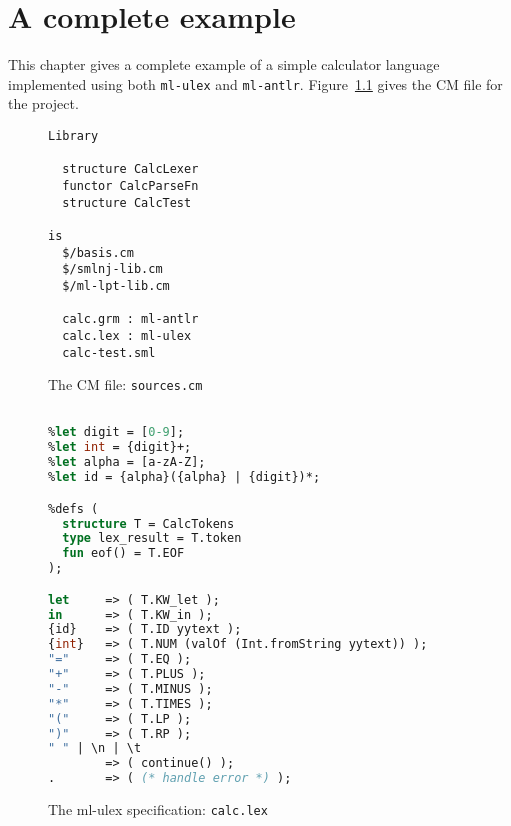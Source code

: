 %
\chapter{A complete example}
\label{ch:example}

This chapter gives a complete example of a simple calculator
language implemented using both \texttt{ml-ulex} and \texttt{ml-antlr}.
Figure~\ref{fig:calc-sources} gives the CM file for the project.
\begin{figure}[h]
\begin{lstlisting}[language=CM]
Library

  structure CalcLexer
  functor CalcParseFn
  structure CalcTest

is
  $/basis.cm
  $/smlnj-lib.cm
  $/ml-lpt-lib.cm

  calc.grm : ml-antlr
  calc.lex : ml-ulex
  calc-test.sml
\end{lstlisting}%
\caption{The CM file: {\tt sources.cm}}
\label{fig:calc-sources}
\end{figure}%

\begin{figure}

\begin{lstlisting}[language=SML]
%name CalcLexer;

%let digit = [0-9];
%let int = {digit}+;
%let alpha = [a-zA-Z];
%let id = {alpha}({alpha} | {digit})*;

%defs (
  structure T = CalcTokens
  type lex_result = T.token
  fun eof() = T.EOF
);

let     => ( T.KW_let );
in      => ( T.KW_in );
{id}    => ( T.ID yytext );
{int}   => ( T.NUM (valOf (Int.fromString yytext)) );
"="     => ( T.EQ );
"+"     => ( T.PLUS );
"-"     => ( T.MINUS );
"*"     => ( T.TIMES );
"("     => ( T.LP );
")"     => ( T.RP );
" " | \n | \t
        => ( continue() );
.       => ( (* handle error *) );
\end{lstlisting}
\caption{The ml-ulex specification: \texttt{calc.lex}}
\label{fig:calc-lex}
\end{figure}%

